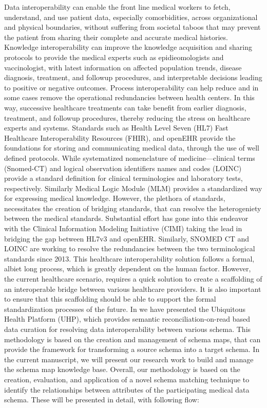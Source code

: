 Data interoperability can enable the front line medical workers to fetch, understand, and use patient data, especially comorbidities, across organizational and physical boundaries, without suffering from societal taboos that may prevent the patient from sharing their complete and accurate medical histories. Knowledge interoperability can improve the knowledge acquisition and sharing protocols to provide the medical experts such as epidieomologists and vaccinologist, with latest information on affected population trends, disease diagnosis, treatment, and followup procedures, and interpretable decisions leading to positive or negative outcomes. Process interoperability can help reduce and in some cases remove the operational redundancies between health centers. In this way, successive healthcare treatments can take benefit from earlier diagnosis, treatment, and followup procedures, thereby reducing the stress on healthcare experts and systems.
Standards such as Health Level Seven (HL7) Fast Healthcare Interoperability Resources (FHIR), and openEHR provide the foundations for storing and communicating medical data, through the use of well defined protocols. While systematized nomenclature of medicine—clinical terms (Snomed-CT) \cite{snomedct_url} and logical observation identifiers names and codes (LOINC) \cite{loinc} provide a standard definition for clinical terminologies and laboratory tests, respectively. Similarly Medical Logic Module (MLM) provides a standardized way for expressing medical knowledge. However, the plethora of standards, necessitates the creation of bridging standards, that can resolve the heterogeniety between the medical standards. Substantial effort has gone into this endeavor with the Clinical Information Modeling Initiative (CIMI) \cite{CIMI2015} taking the lead in bridging the gap between HL7v3 and openEHR. Similarly, SNOMED CT and LOINC are working to resolve the redundancies between the two terminological standards since 2013. This healthcare interoperability solution follows a formal, albiet long process, which is greatly dependent on the human factor. However, the current healthcare scenario, requires a quick solution to create a scaffolding of an interoperable bridge between various healthcare providers. It is also important to ensure that this scaffolding should be able to support the formal standardization processes of the future. In \cite{Satti2020}we have presented the Ubiquitous Health Platform (UHP), which provides semantic reconciliation-on-read based data curation for resolving data interoperability between various schema. This methodology is based on the creation and management of schema maps, that can provide the framework for transforming a source schema into a target schema. 
In the current manuscript, we will present our research work to build and manage the schema map knowledge base. Overall, our methodology is based on the creation, evaluation, and application of a novel schema matching technique to identify the relationships between attributes of the participating medical data schema. These will be presented in detail, with following flow:

